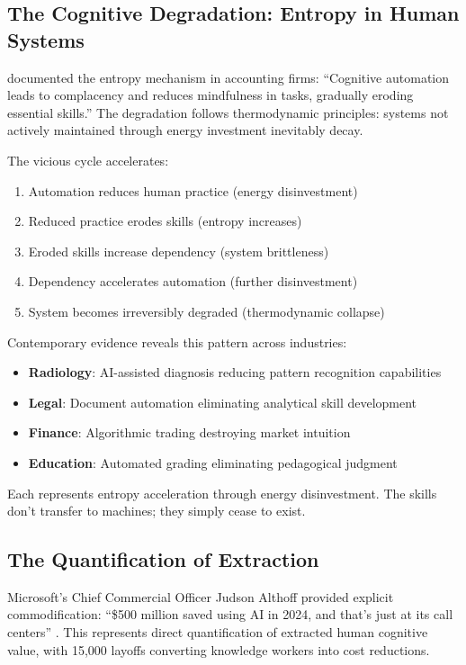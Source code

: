 \subsection{The Cognitive Degradation: Entropy in Human Systems}

\citet{rintakahila2023} documented the entropy mechanism in accounting firms: ``Cognitive automation leads to complacency and reduces mindfulness in tasks, gradually eroding essential skills.'' The degradation follows thermodynamic principles: systems not actively maintained through energy investment inevitably decay.

The vicious cycle accelerates:
\begin{enumerate}
\item Automation reduces human practice (energy disinvestment)
\item Reduced practice erodes skills (entropy increases)
\item Eroded skills increase dependency (system brittleness)
\item Dependency accelerates automation (further disinvestment)
\item System becomes irreversibly degraded (thermodynamic collapse)
\end{enumerate}

Contemporary evidence reveals this pattern across industries:
\begin{itemize}
\item \textbf{Radiology}: AI-assisted diagnosis reducing pattern recognition capabilities
\item \textbf{Legal}: Document automation eliminating analytical skill development
\item \textbf{Finance}: Algorithmic trading destroying market intuition
\item \textbf{Education}: Automated grading eliminating pedagogical judgment
\end{itemize}

Each represents entropy acceleration through energy disinvestment. The skills don't transfer to machines; they simply cease to exist.

\subsection{The Quantification of Extraction}

Microsoft's Chief Commercial Officer Judson Althoff provided explicit commodification: ``\$500 million saved using AI in 2024, and that's just at its call centers'' \citep{althoff2024}. This represents direct quantification of extracted human cognitive value, with 15,000 layoffs converting knowledge workers into cost reductions.

